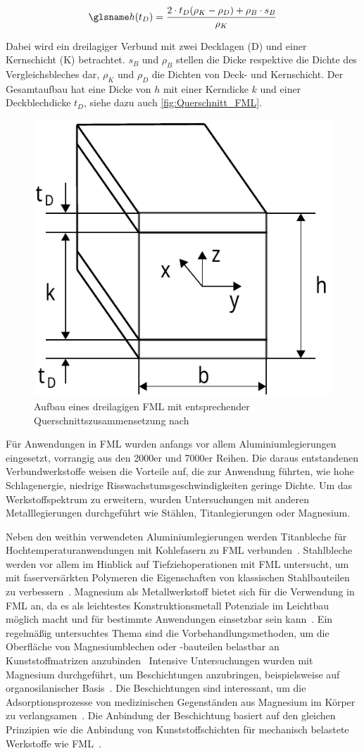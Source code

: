 \begin{equation}
    \s{h}(t_D) = \frac{2 \cdot t_D (\rho_K - \rho_D) + \rho_B \cdot s_B}{\rho_K}
    \label{eq:Dicke_FML}
\end{equation}

Dabei wird ein dreilagiger Verbund mit zwei Decklagen (D) und einer Kernschicht (K) betrachtet. $s_B$ und $\rho_B$ stellen die Dicke respektive die Dichte des Vergleichsbleches dar, $\rho_K$ und $\rho_D$ die Dichten von Deck- und Kernschicht.
Der Gesamtaufbau hat eine Dicke von $h$ mit einer Kerndicke $k$ und einer Deckblechdicke $t_D$, siehe dazu auch \autoref{fig:Querschnitt_FML}.

\begin{figure}[H]%
    \centering
    \includegraphics[width=0.3\linewidth]{Bilder/SdT/Aufbau_Dichte_FML}
    \caption[Aufbau eines dreilagigen FML]{Aufbau eines dreilagigen FML mit entsprechender Querschnittszusammensetzung nach~\cite{Wollmann2018}}
    \label{fig:Querschnitt_FML}
\end{figure}

Für Anwendungen in FML wurden anfangs vor allem Aluminiumlegierungen eingesetzt, vorrangig aus den 2000er und 7000er Reihen.
Die daraus entstandenen Verbundwerkstoffe weisen die Vorteile auf, die zur Anwendung führten, wie hohe Schlagenergie, niedrige Risswachstumsgeschwindigkeiten geringe Dichte.
Um das Werkstoffspektrum zu erweitern, wurden Untersuchungen mit anderen Metalllegierungen durchgeführt wie Stählen, Titanlegierungen oder Magnesium.

Neben den weithin verwendeten Aluminiumlegierungen werden Titanbleche für Hochtemperaturanwendungen mit Kohlefasern zu FML verbunden~\cite{Burianek2003,Hu2020}.
Stahlbleche werden vor allem im Hinblick auf Tiefziehoperationen mit FML untersucht, um mit faserversärkten Polymeren die Eigenschaften von klassischen Stahlbauteilen zu verbessern~\cite{Behrens2014,Behrens2017,Blala2021,Hahn2018}.
Magnesium als Metallwerkstoff bietet sich für die Verwendung in FML an, da es als leichtestes Konstruktionsmetall Potenziale im Leichtbau möglich macht und für bestimmte Anwendungen einsetzbar sein kann~\cite{Cortes2005,Alderliesten2008}.
Ein regelmäßig untersuchtes Thema sind die Vorbehandlungsmethoden, um die Oberfläche von Magnesiumblechen oder -bauteilen belastbar an Kunststoffmatrizen anzubinden~\cite{Cicco2019,Cicco2019a}
Intensive Untersuchungen wurden mit Magnesium durchgeführt, um Beschichtungen anzubringen, beispielsweise auf organosilanischer Basis~\cite{Hausbeck2012}.
Die Beschichtungen sind interessant, um die Adsorptionsprozesse von medizinischen Gegenständen aus Magnesium im Körper zu verlangsamen~\cite{Galvin2013,Zucchi2006}.
Die Anbindung der Beschichtung basiert auf den gleichen Prinzipien wie die Anbindung von Kunststoffschichten für mechanisch belastete Werkstoffe wie FML~.

